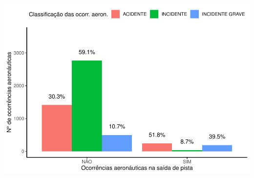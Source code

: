 \documentclass[
]{article}
\begin{document}
\begin{center}\includegraphics{4.Relatorio/pdf/index_files/figure-latex/unnamed-chunk-37-1} \end{center}
\end{document}
